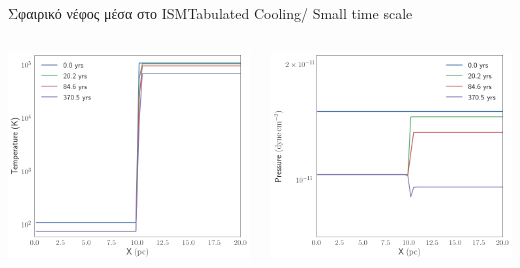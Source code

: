 \documentclass{beamer}
\begin{document}
\begin{frame}{Σφαιρικό νέφος μέσα στο ISM}{Tabulated Cooling/ Small time scale}
	\begin{columns}
			\begin{center}
				\includegraphics[width=1\linewidth]{../Document/DataImages/TabCoolingTMPprofile-micro}
			\end{center}
			\begin{center}
				\includegraphics[width=1\linewidth]{../Document/DataImages/TabCoolingPRSprofile-micro}
			\end{center}
	\end{columns}
\end{frame}
\end{document}
